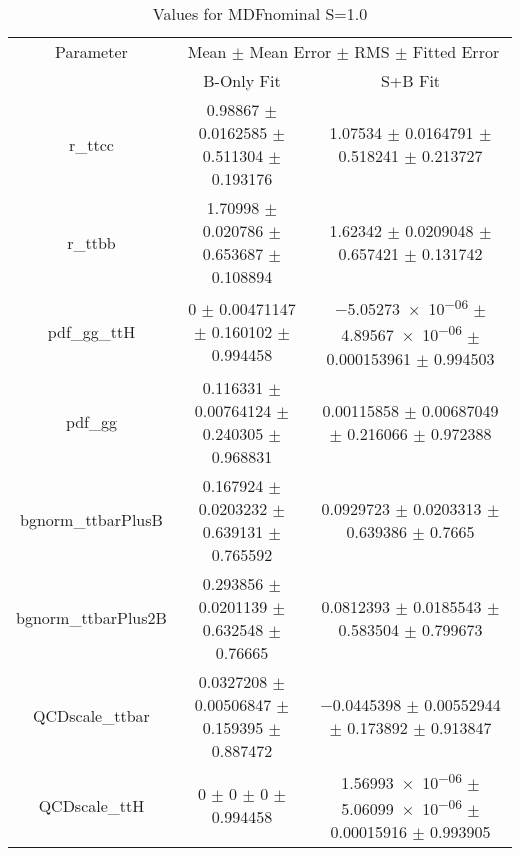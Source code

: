 \begin{table}
\centering
\caption{Values for MDFnominal S=1.0}
\begin{tabular}{ccc}
\toprule
Parameter & \multicolumn{2}{c}{Mean $\pm$ Mean Error $\pm$ RMS $\pm$ Fitted Error}\\
 & B-Only Fit & S+B Fit\\
\midrule
r\_ttcc & \num{0.98867} $\pm$ \num{0.0162585} $\pm$ \num{0.511304} $\pm$ \num{0.193176} & \num{1.07534} $\pm$ \num{0.0164791} $\pm$ \num{0.518241} $\pm$ \num{0.213727}\\
r\_ttbb & \num{1.70998} $\pm$ \num{0.020786} $\pm$ \num{0.653687} $\pm$ \num{0.108894} & \num{1.62342} $\pm$ \num{0.0209048} $\pm$ \num{0.657421} $\pm$ \num{0.131742}\\
pdf\_gg\_ttH & \num{0} $\pm$ \num{0.00471147} $\pm$ \num{0.160102} $\pm$ \num{0.994458} & \num{-5.05273e-06} $\pm$ \num{4.89567e-06} $\pm$ \num{0.000153961} $\pm$ \num{0.994503}\\
pdf\_gg & \num{0.116331} $\pm$ \num{0.00764124} $\pm$ \num{0.240305} $\pm$ \num{0.968831} & \num{0.00115858} $\pm$ \num{0.00687049} $\pm$ \num{0.216066} $\pm$ \num{0.972388}\\
bgnorm\_ttbarPlusB & \num{0.167924} $\pm$ \num{0.0203232} $\pm$ \num{0.639131} $\pm$ \num{0.765592} & \num{0.0929723} $\pm$ \num{0.0203313} $\pm$ \num{0.639386} $\pm$ \num{0.7665}\\
bgnorm\_ttbarPlus2B & \num{0.293856} $\pm$ \num{0.0201139} $\pm$ \num{0.632548} $\pm$ \num{0.76665} & \num{0.0812393} $\pm$ \num{0.0185543} $\pm$ \num{0.583504} $\pm$ \num{0.799673}\\
QCDscale\_ttbar & \num{0.0327208} $\pm$ \num{0.00506847} $\pm$ \num{0.159395} $\pm$ \num{0.887472} & \num{-0.0445398} $\pm$ \num{0.00552944} $\pm$ \num{0.173892} $\pm$ \num{0.913847}\\
QCDscale\_ttH & \num{0} $\pm$ \num{0} $\pm$ \num{0} $\pm$ \num{0.994458} & \num{1.56993e-06} $\pm$ \num{5.06099e-06} $\pm$ \num{0.00015916} $\pm$ \num{0.993905}\\
\bottomrule
\end{tabular}
\end{table}
